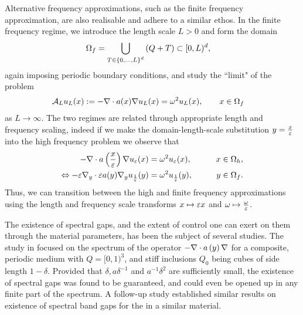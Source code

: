 Alternative frequency approximations, such as the finite frequency approximation, are also realisable and adhere to a similar ethos.
In the finite frequency regime, we introduce the length scale $L>0$ and form the domain
\begin{align*}
	\Omega_f &= \bigcup_{T\in\left\{ 0,...,L \right\}^d}\left( Q + T \right)\subset[0,L)^d,
\end{align*}
again imposing periodic boundary conditions, and study the ``limit" of the problem
\begin{align*}
	\mathcal{A}_L u_L(x) &:= -\nabla\cdot a(x)\nabla u_L(x) = \omega^2 u_L(x), \qquad x\in\Omega_f
\end{align*}
as $L\rightarrow\infty$.
The two regimes are related through appropriate length and frequency scaling, indeed if we make the domain-length-scale substitution $y = \frac{x}{\varepsilon}$ into the high frequency problem we observe that
\begin{align*}
	-\nabla\cdot a\left( \frac{x}{\varepsilon} \right)\nabla u_{\varepsilon}(x) &= \omega^2 u_{\varepsilon}(x), &\qquad x\in\Omega_h, \\
	\Leftrightarrow -\varepsilon\nabla_{y}\cdot \varepsilon a(y)\nabla_{y}u_{\frac{1}{\varepsilon}}(y) &= \omega^2 u_{\frac{1}{\varepsilon}}(y), &\qquad y\in\Omega_f.
\end{align*}
Thus, we can transition between the high and finite frequency approximations using the length and frequency scale transforms $x \mapsto \varepsilon x$ and $\omega \mapsto \frac{\omega}{\varepsilon}$.


The existence of spectral gaps, and the extent of control one can exert on them through the material parameters, has been the subject of several studies.
The study in  focused on the spectrum of the operator $-\nabla\cdot a\left( y \right)\nabla$ for a composite, periodic medium with $Q=[0,1)^3$, and stiff inclusions $Q_0$ being cubes of side length $1-\delta$.
Provided that $\delta, a\delta^{-1}$ and $a^{-1}\delta^2$ are sufficiently small, the existence of spectral gaps was found to be guaranteed, and could even be opened up in any finite part of the spectrum.
A follow-up study  established similar results on existence of spectral band gaps for the  in a similar material.
